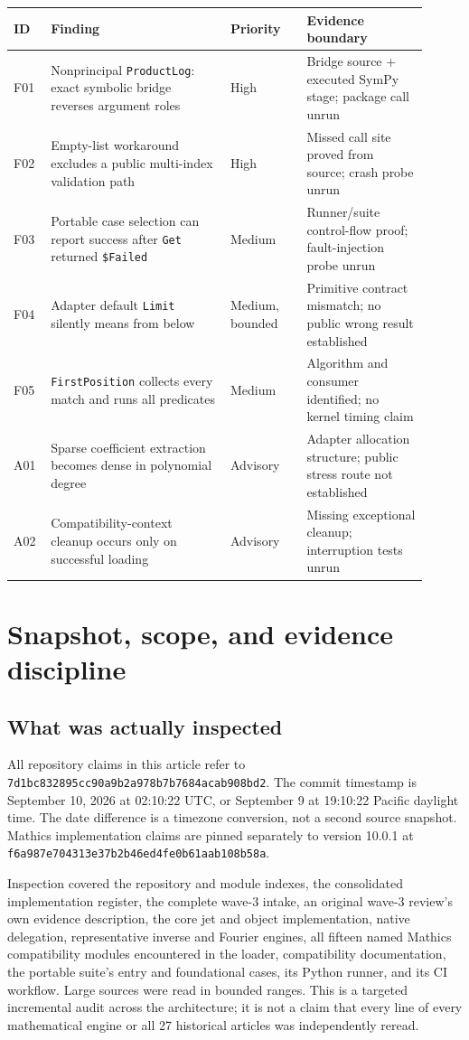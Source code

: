 \documentclass[11pt,letterpaper]{article}
\newcommand{\code}[1]{\texttt{#1}}
\newcommand{\snapshot}{\texttt{7d1bc832895cc90a9b2a978b7b7684acab908bd2}}
\newcommand{\mathicssnapshot}{\texttt{f6a987e704313e37b2b46ed4fe0b61aab108b58a}}
\begin{document}
\begin{longtable}{@{}P{0.07\linewidth}P{0.40\linewidth}P{0.17\linewidth}P{0.27\linewidth}@{}}
\toprule
ID & Finding & Priority & Evidence boundary\\
\midrule\endhead
F01 & Nonprincipal \code{ProductLog}: exact symbolic bridge reverses argument roles & High & Bridge source + executed SymPy stage; package call unrun\\
F02 & Empty-list workaround excludes a public multi-index validation path & High & Missed call site proved from source; crash probe unrun\\
F03 & Portable case selection can report success after \code{Get} returned \code{\$Failed} & Medium & Runner/suite control-flow proof; fault-injection probe unrun\\
F04 & Adapter default \code{Limit} silently means from below & Medium, bounded & Primitive contract mismatch; no public wrong result established\\
F05 & \code{FirstPosition} collects every match and runs all predicates & Medium & Algorithm and consumer identified; no kernel timing claim\\
A01 & Sparse coefficient extraction becomes dense in polynomial degree & Advisory & Adapter allocation structure; public stress route not established\\
A02 & Compatibility-context cleanup occurs only on successful loading & Advisory & Missing exceptional cleanup; interruption tests unrun\\
\bottomrule
\end{longtable}

\section{Snapshot, scope, and evidence discipline}

\subsection{What was actually inspected}

All repository claims in this article refer to \snapshot. The commit timestamp is September 10, 2026 at 02:10:22 UTC, or September 9 at 19:10:22 Pacific daylight time. The date difference is a timezone conversion, not a second source snapshot. Mathics implementation claims are pinned separately to version 10.0.1 at \mathicssnapshot.~\cite{commit,mathics-tag}

Inspection covered the repository and module indexes, the consolidated implementation register, the complete wave-3 intake, an original wave-3 review's own evidence description, the core jet and object implementation, native delegation, representative inverse and Fourier engines, all fifteen named Mathics compatibility modules encountered in the loader, compatibility documentation, the portable suite's entry and foundational cases, its Python runner, and its CI workflow. Large sources were read in bounded ranges. This is a targeted incremental audit across the architecture; it is not a claim that every line of every mathematical engine or all 27 historical articles was independently reread.~\cite{modules,register,intake,review23,compat,portable,runner,workflow}
\end{document}
